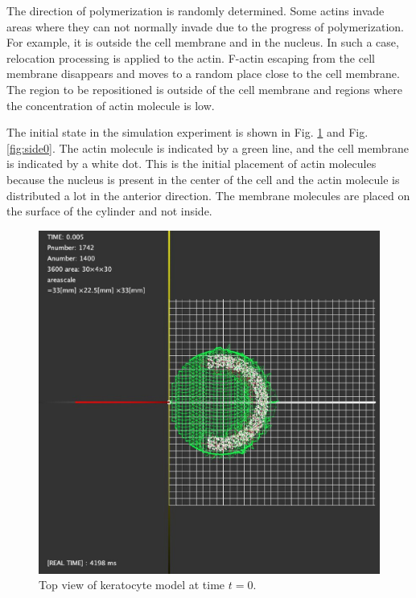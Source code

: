 \documentclass[a4paper,12pt]{book}
\begin{document}
The direction of polymerization is randomly determined. Some actins invade areas where they can not normally invade due to the progress of polymerization. For example, it is outside the cell membrane and in the nucleus. In such a case, relocation processing is applied to the actin. F-actin escaping from the cell membrane disappears and moves to a random place close to the cell membrane. The region to be repositioned is outside of the cell membrane and regions where the concentration of actin molecule is low.

The initial state in the simulation experiment is shown in Fig. \ref{fig:top0} and Fig. \ref{fig:side0}. The actin molecule is indicated by a green line, and the cell membrane is indicated by a white dot. This is the initial placement of actin molecules because the nucleus is present in the center of the cell and the actin molecule is distributed a lot in the anterior direction. The membrane molecules are placed on the surface of the cylinder and not inside.
\begin{figure}[tbp]
\centering
\includegraphics[scale=0.25]{top.eps}
\caption{Top view of keratocyte model at time $t=0$.}
\label{fig:top0}
\end{figure}
\end{document}
